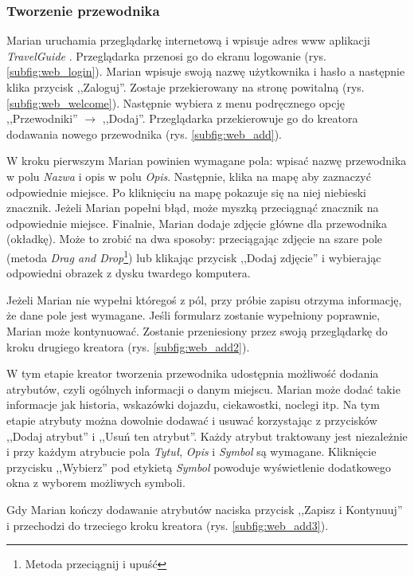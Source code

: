 \documentclass[a4paper]{book}
\newcommand{\appName}{\emph{TravelGuide} }
\begin{document}
			\subsubsection{Tworzenie przewodnika}
			
			Marian uruchamia przeglądarkę internetową i wpisuje adres www aplikacji \appName. Przeglądarka przenosi go do ekranu logowanie (rys. \ref{subfig:web_login}). Marian wpisuje swoją nazwę użytkownika i hasło a następnie klika przycisk ,,Zaloguj''. Zostaje przekierowany na stronę powitalną (rys. \ref{subfig:web_welcome}). Następnie wybiera z menu podręcznego opcję ,,Przewodniki'' $\rightarrow$ ,,Dodaj''. Przeglądarka przekierowuje go do kreatora dodawania nowego przewodnika (rys. \ref{subfig:web_add}). 
			
			W kroku pierwszym Marian powinien wymagane pola: wpisać nazwę przewodnika w polu \textit{Nazwa} i opis w polu \textit{Opis}. Następnie, klika na mapę aby zaznaczyć odpowiednie miejsce. Po kliknięciu na mapę pokazuje się na niej niebieski znacznik. Jeżeli Marian popełni błąd, może myszką przeciągnąć znacznik na odpowiednie miejsce. Finalnie, Marian dodaje zdjęcie główne dla przewodnika (okładkę). Może to zrobić na dwa sposoby: przeciągając zdjęcie na szare pole (metoda \textit{Drag and Drop}\footnote{Metoda przeciągnij i upuść}) lub klikając przycisk ,,Dodaj zdjęcie'' i wybierając odpowiedni obrazek z dysku twardego komputera. 
			
			Jeżeli Marian nie wypełni któregoś z pól, przy próbie zapisu otrzyma informację, że dane pole jest wymagane. Jeśli formularz zostanie wypełniony poprawnie, Marian może kontynuować. Zostanie przeniesiony przez swoją przeglądarkę do kroku drugiego kreatora (rys. \ref{subfig:web_add2}). 
			
			W tym etapie kreator tworzenia przewodnika udostępnia możliwość dodania atrybutów, czyli ogólnych informacji o danym miejscu. Marian może dodać takie informacje jak historia, wskazówki dojazdu, ciekawostki, noclegi itp. Na tym etapie atrybuty można dowolnie dodawać i usuwać korzystając z przycisków ,,Dodaj atrybut'' i ,,Usuń ten atrybut''. Każdy atrybut traktowany jest niezależnie i przy każdym atrybucie pola \textit{Tytuł}, \textit{Opis} i \textit{Symbol} są wymagane. Kliknięcie przycisku ,,Wybierz'' pod etykietą \textit{Symbol} powoduje wyświetlenie dodatkowego okna z wyborem możliwych symboli. 
			
			Gdy Marian kończy dodawanie atrybutów naciska przycisk ,,Zapisz i Kontynuuj'' i przechodzi do trzeciego kroku kreatora (rys. \ref{subfig:web_add3}).
			
\end{document}
